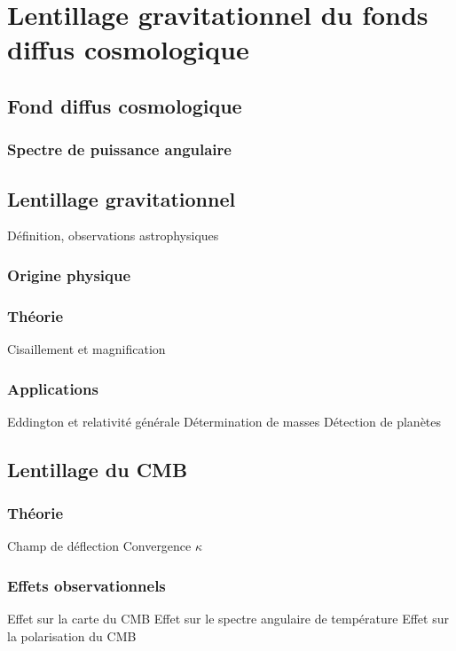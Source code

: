 
\chapter{Lentillage gravitationnel du fonds diffus cosmologique} %

\label{Chapter2} %


\section{Fond diffus cosmologique}
\subsection{Spectre de puissance angulaire}

\section{Lentillage gravitationnel}
Définition, observations astrophysiques
\subsection{Origine physique}
\subsection{Théorie}
Cisaillement et magnification
\subsection{Applications}
Eddington et relativité générale
Détermination de masses
Détection de planètes

\section{Lentillage du CMB}
\subsection{Théorie}
Champ de déflection
Convergence $\kappa$

\subsection{Effets observationnels}
Effet sur la carte du CMB
Effet sur le spectre angulaire de température
Effet sur la polarisation du CMB